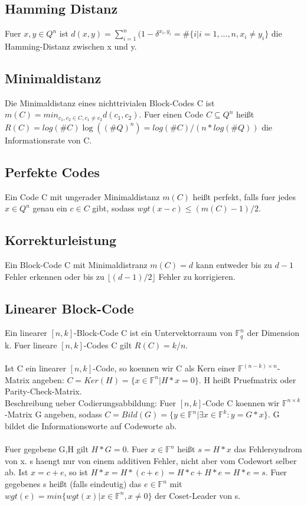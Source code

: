 \documentclass[a4paper]{scrreprt}
\begin{document}
\subsection{Hamming Distanz}
Fuer $x,y \in Q^n$ ist $d(x,y) = \sum_{i=1}^n(1-\delta^{x_i, y_i} = \#\{i|i = 1,...,n,x_i \neq y_i\}$ die Hamming-Distanz zwischen x und y.

\subsection{Minimaldistanz}
Die Minimaldistanz eines nichttrivialen Block-Codes C ist $m(C) = min_{c_1,c_2 \in C, c_1 \neq c_2}d(c_1, c_2)$.
Fuer einen Code $C \subseteq Q^n$ heißt $R(C) = log(\#C)\log((\#Q)^n) = log(\#C)/(n*log(\#Q))$ die Informationsrate von C.

\subsection{Perfekte Codes}
Ein Code C mit ungerader Minimaldistanz $m(C)$ heißt perfekt, falls fuer jedes $x \in Q^n$ genau ein $c \in C$ gibt, sodass $wgt(x-c) \le (m(C)-1)/2$.

\subsection{Korrekturleistung}
Ein Block-Code C mit Minimaldistranz $m(C) = d$ kann entweder bis zu $d-1$ Fehler erkennen oder bis zu $\lfloor (d-1)/2 \rfloor$ Fehler zu korrigieren.

\subsection{Linearer Block-Code}
Ein linearer $[n,k]$-Block-Code C ist ein Untervektorraum von $\mathbb{F}_q^n$ der Dimension k.
Fuer lineare $[n,k]$-Codes C gilt $R(C) = k/n$.\\\\
Ist C ein linearer $[n,k]$-Code, so koennen wir C als Kern einer $\mathbb{F}^{(n-k)\times n}$-Matrix angeben: $C = Ker(H) = \{x \in \mathbb{F}^n|H*x = 0\}$.
H heißt Pruefmatrix oder Parity-Check-Matrix.\\
Beschreibung ueber Codierungsabbildung: Fuer $[n,k]$-Code C koennen wir $\mathbb{F}^{n \times k}$-Matrix G angeben, sodass $C = Bild(G) = \{y \in \mathbb{F}^n|\exists x \in \mathbb{F}^k:y = G*x\}$.
G bildet die Informationsworte auf Codeworte ab.\\\\
Fuer gegebene G,H gilt $H*G = 0$.
Fuer $x \in \mathbb{F}^n$ heißt $s = H*x$ das Fehlersyndrom von x.
s haengt nur von einem additiven Fehler, nicht aber vom Codewort selber ab. Ist $x = c+e$, so ist $H * x = H*(c+e) = H*c + H*e = H*e = s$.
Fuer gegebenes s heißt (falls eindeutig) das $e \in \mathbb{F}^n$ mit $wgt(e) = min\{wgt(x)|x \in \mathbb{F}^n, x \neq 0\}$ der Coset-Leader von s.
\end{document}

